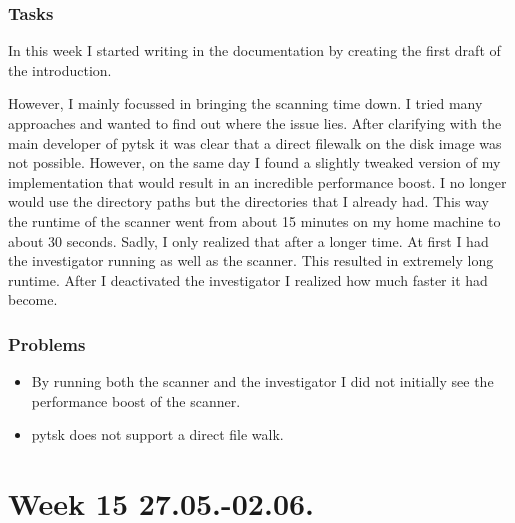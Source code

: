 \subsubsection{Tasks}

In this week I started writing in the documentation by creating the first draft of the introduction. 

However, I mainly focussed in bringing the scanning time down. I tried many approaches and wanted to find out where the issue lies. After clarifying with the main developer of \gls{pytsk} it was clear that a direct filewalk on the disk image was not possible. However, on the same day I found a slightly tweaked version of my implementation that would result in an incredible performance boost. I no longer would use the directory paths but the directories that I already had. This way the runtime of the scanner went from about 15 minutes on my home machine to about 30 seconds. Sadly, I only realized that after a longer time. At first I had the investigator running as well as the scanner. This resulted in extremely long runtime. After I deactivated the investigator I realized how much faster it had become. 

\subsubsection{Problems}

\begin{itemize}
    \item By running both the scanner and the investigator I did not initially see the performance boost of the scanner.
    \item \Gls{pytsk} does not support a direct file walk.
\end{itemize}

\section{Week 15 27.05.-02.06.}
\label{sec:journal:week15}

